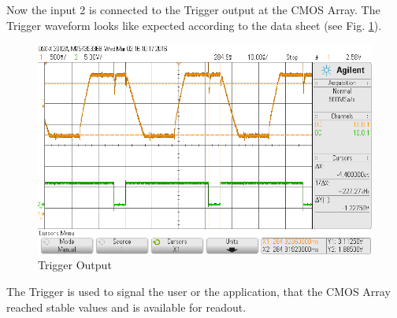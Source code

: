 Now the input 2 is connected to the Trigger output at the CMOS Array. The Trigger waveform looks like expected according to the data sheet (see Fig. \ref{fig:spot5}).
\begin{figure}[H]
\begin{center}
\includegraphics[scale=0.4]{LabFour/scope_87}
\end{center}
\caption{Trigger Output}
\label{fig:spot5}
\end{figure}

The Trigger is used to signal the user or the application, that the CMOS Array reached stable values and is available for readout. 
